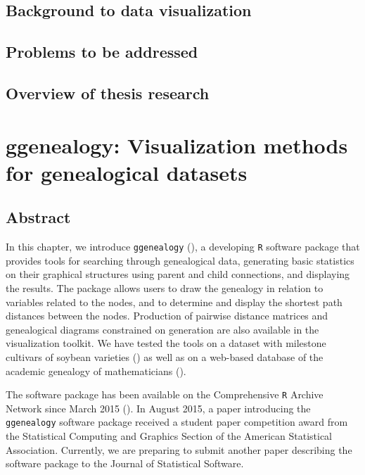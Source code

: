 \documentclass[11pt,a4paper,oldfontcommands,openany]{memoir}
\numberwithin{equation}{section} %
\newcommand{\pkg}[1]{{\texttt{#1}}}
\begin{document}
\section{Background to data visualization}

\lipsum[1]

\section{Problems to be addressed}

\lipsum[2]

\section{Overview of thesis research}
\label{sec:helpSection}

\lipsum[3]

\chapter{ggenealogy: Visualization methods for genealogical datasets}
\label{sec:ggenealogy}

\section{Abstract}

In this chapter, we introduce \pkg{ggenealogy} (\citealt{ggen}), a developing \pkg{R} software package that provides tools for searching through genealogical data, generating basic statistics on their graphical structures using parent and child connections, and displaying the results. The package allows users to draw the genealogy in relation to variables related to the nodes, and to determine and display the shortest path distances between the nodes. Production of pairwise distance matrices and genealogical diagrams constrained on generation are also available in the visualization toolkit. We have tested the tools on a dataset with milestone cultivars of soybean varieties (\citealt{soybean}) as well as on a web-based database of the academic genealogy of mathematicians (\citealt{mgp}).

The software package has been available on the Comprehensive \pkg{R} Archive Network since March 2015 (\citealt{ggen}). In August 2015, a paper introducing the \pkg{ggenealogy} software package received a student paper competition award from the Statistical Computing and Graphics Section of the American Statistical Association. Currently, we are preparing to submit another paper describing the software package to the Journal of Statistical Software.
\end{document}
